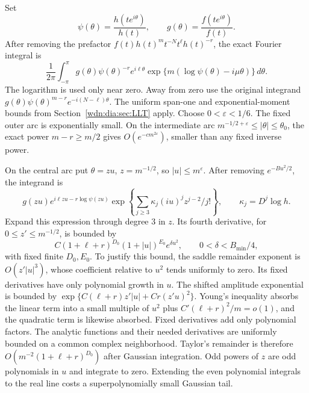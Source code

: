 \documentclass[11pt,letterpaper]{article}
\theoremstyle{remark}\newtheorem{remark}[theorem]{Remark}
\begin{document}
Set
\[
 \psi(\theta)=\frac{h(te^{i\theta})}{h(t)},\qquad
 g(\theta)=\frac{f(te^{i\theta})}{f(t)}.
\]
After removing the prefactor $f(t)h(t)^mt^{-N}t^\ell h(t)^{-r}$, the exact
Fourier integral is
\begin{equation}\label{wdn:dia:eq:shiftintegral}
 \frac1{2\pi}\int_{-\pi}^{\pi}
 g(\theta)\psi(\theta)^{-r}e^{i\ell\theta}
 \exp\{m(\log\psi(\theta)-i\mu\theta)\}\,d\theta.
\end{equation}
The logarithm is used only near zero. Away from zero use the original
integrand $g(\theta)\psi(\theta)^{m-r}e^{-i(N-\ell)\theta}$.
The uniform span-one and exponential-moment bounds from
Section~\ref{wdn:dia:sec:LLT} apply. Choose $0<\varepsilon<1/6$.
The fixed outer arc is exponentially small. On the intermediate arc
$m^{-1/2+\varepsilon}\le|\theta|\le\theta_0$, the exact power $m-r\ge m/2$
gives $O(e^{-cm^{2\varepsilon}})$, smaller than any fixed inverse power.

On the central arc put $\theta=zu$, $z=m^{-1/2}$, so $|u|\le m^\varepsilon$.
After removing $e^{-Bu^2/2}$, the integrand is
\begin{equation}\label{wdn:dia:eq:centralE}
 g(zu)e^{i\ell zu-r\log\psi(zu)}
 \exp\left\{\sum_{j\ge3}\kappa_j(iu)^jz^{j-2}/j!\right\},
 \qquad \kappa_j=D^j\log h.
\end{equation}
Expand this expression through degree $3$ in $z$. Its fourth derivative,
for $0\le z'\le m^{-1/2}$, is bounded by
\[
 C(1+\ell+r)^{D_0}(1+|u|)^{E_0}e^{\delta u^2},\qquad
 0<\delta<B_{\min}/4,
\]
with fixed finite $D_0,E_0$. To justify this bound, the saddle remainder
exponent is $O(z'|u|^3)$, whose coefficient relative to $u^2$ tends uniformly
to zero. Its fixed derivatives have only polynomial growth in $u$. The
shifted amplitude exponential is bounded by
$\exp\{C(\ell+r)z'|u|+Cr(z'u)^2\}$. Young's inequality absorbs the linear
term into a small multiple of $u^2$ plus $C'(\ell+r)^2/m=o(1)$, and the
quadratic term is likewise absorbed. Fixed derivatives add only polynomial
factors. The analytic functions and their needed derivatives are uniformly
bounded on a common complex neighborhood. Taylor's remainder is therefore
$O(m^{-2}(1+\ell+r)^{D_0})$ after Gaussian integration. Odd powers of $z$
are odd polynomials in $u$ and integrate to zero. Extending the even
polynomial integrals to the real line costs a superpolynomially small
Gaussian tail.
\end{document}
